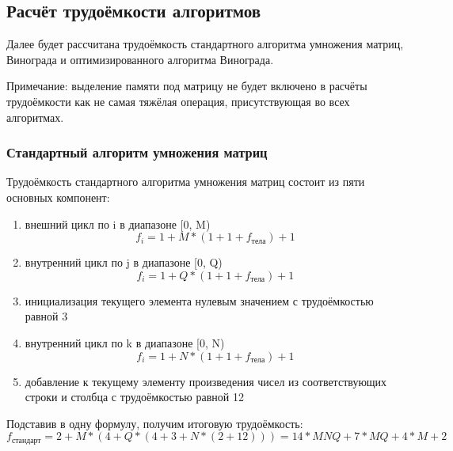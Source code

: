 \subsection{Расчёт трудоёмкости алгоритмов}

\hspace{1.25cm}
Далее будет рассчитана трудоёмкость стандартного алгоритма умножения матриц, Винограда и оптимизированного алгоритма Винограда.

Примечание: выделение памяти под матрицу не будет включено в расчёты трудоёмкости как не самая тяжёлая операция, присутствующая во всех алгоритмах.

\subsubsection{Стандартный алгоритм умножения матриц}

\hspace{1.25cm}
Трудоёмкость стандартного алгоритма умножения матриц состоит из пяти основных компонент:

\begin{enumerate}

\item внешний цикл по i в диапазоне [0, M)
\begin{equation}
f_i = 1 + M * (1 + 1 + f_{\text{тела}}) + 1
\end{equation}

\item внутренний цикл по j в диапазоне [0, Q)
\begin{equation}
f_i = 1 + Q * (1 + 1 + f_{\text{тела}}) + 1
\end{equation}

\item инициализация текущего элемента нулевым значением с трудоёмкостью равной 3


\item внутренний цикл по k в диапазоне [0, N)
\begin{equation}
f_i = 1 + N * (1 + 1 + f_{\text{тела}}) + 1
\end{equation}

\item добавление к текущему элементу произведения чисел из соответствующих строки и столбца с трудоёмкостью равной 12

\end{enumerate}

Подставив в одну формулу, получим итоговую трудоёмкость:
\begin{equation}
f_{\text{стандарт}} = 2 + M * (4 + Q * (4 + 3 + N * (2 + 12))) = 14 * MNQ + 7 * MQ + 4 * M  + 2
\end{equation}


